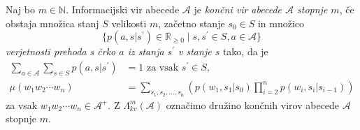 \documentclass[fin1, tisk]{fmfdelo}
\newcommand{\N}{\mathbb{N}}
\newcommand{\R}{\mathbb{R}}
\newcommand{\A}{\mathcal{A}}
\theoremstyle{definition}
\begin{document}
\begin{definicija}\label{def:FSS} %
    Naj bo $m \in \N$. Informacijski vir abecede $\A$ je 
    \emph{končni vir abecede $\A$ stopnje $m$}, če obstaja množica stanj $S$ velikosti $m$, 
    začetno stanje $s_0 \in S$ in množico
    \[
        \{ p(a, s|s^\prime) \in \R_{\geq 0} \mid s, s^\prime \in S, a \in \A \}
    \]
    \emph{verjetnosti prehoda s črko $a$ iz stanja $s^\prime$ v stanje $s$} tako, da je
    \begin{align*}
        \sum_{a \in \A} \sum_{s \in S} p(a, s|s^\prime) &= 1 \text{ za vsak } s^\prime \in S, \\
        \mu(w_1w_2 \cdots w_n) &= \sum_{s_1, s_2, \ldots, s_n} 
        \left( p(w_1,s_1|s_0) \prod_{i=2}^{n} p(w_i, s_i|s_{i-1}) \right)
    \end{align*}
    za vsak $w_1w_2 \cdots w_n \in \A^+$.
    Z $\Lambda_{kv}^m(\A)$ označimo družino končnih virov abecede $\A$ stopnje $m$.
\end{definicija}
\end{document}
